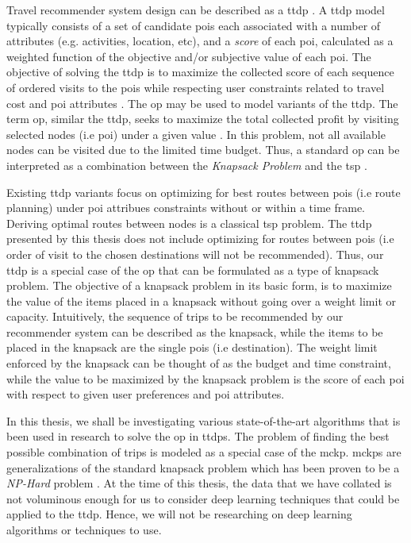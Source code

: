 Travel recommender system design can be described as a \gls{ttdp} \parencite{Vansteenwegen2007TheOpportunity}. A \gls{ttdp} model typically consists of a set of candidate \glspl{poi} each associated with a number of attributes (e.g. activities, location, etc), and a \textit{score} of each \gls{poi}, calculated as a weighted function of the objective and/or subjective value of each \gls{poi}. The objective of solving the \gls{ttdp} is to maximize the collected score of each sequence of ordered visits to the \glspl{poi} while respecting user constraints related to travel cost and \gls{poi} attributes \parencite{Survey_TTDP_Guavalas}. The \gls{op} may be used to model variants of the \gls{ttdp}. The term \gls{op}, similar the \gls{ttdp}, seeks to maximize the total collected profit by visiting selected nodes (i.e \gls{poi}) under a given value \parencite{T.1984HeuristicOrienteering}. In this problem, not all available nodes can be visited due to the limited time budget. Thus, a standard \gls{op} can be interpreted as a combination between the \textit{Knapsack Problem} and the \gls{tsp} \parencite{OP_Solution_Gunawan}. 

Existing \gls{ttdp} variants focus on optimizing for best routes between \glspl{poi} (i.e route planning) under \gls{poi} attribues constraints without or within a time frame. Deriving optimal routes between nodes is a classical \gls{tsp} problem. The \gls{ttdp} presented by this thesis does not include optimizing for routes between \glspl{poi} (i.e order of visit to the chosen destinations will not be recommended). Thus, our \gls{ttdp} is a special case of the \gls{op} that can be formulated as a type of knapsack problem. The objective of a knapsack problem in its basic form, is to maximize the value of the items placed in a knapsack without going over a weight limit or capacity. Intuitively, the sequence of trips to be recommended by our recommender system can be described as the knapsack, while the items to be placed in the knapsack are the single \glspl{poi} (i.e destination). The weight limit enforced by the knapsack can be thought of as the budget and time constraint, while the value to be maximized by the knapsack problem is the score of each \gls{poi} with respect to given user preferences and \gls{poi} attributes.

In this thesis, we shall be investigating various state-of-the-art algorithms that is been used in research to solve the \gls{op} in \glspl{ttdp}. The problem of finding the best possible combination of trips is modeled as a special case of the \gls{mckp}. \Glspl{mckp} are generalizations of the standard knapsack problem which has been proven to be a \textit{NP-Hard} problem \parencite{Kellerer2004TheProblem}. At the time of this thesis, the data that we have collated is not voluminous enough for us to consider deep learning techniques that could be applied to the \gls{ttdp}. Hence, we will not be researching on deep learning algorithms or techniques to use.


